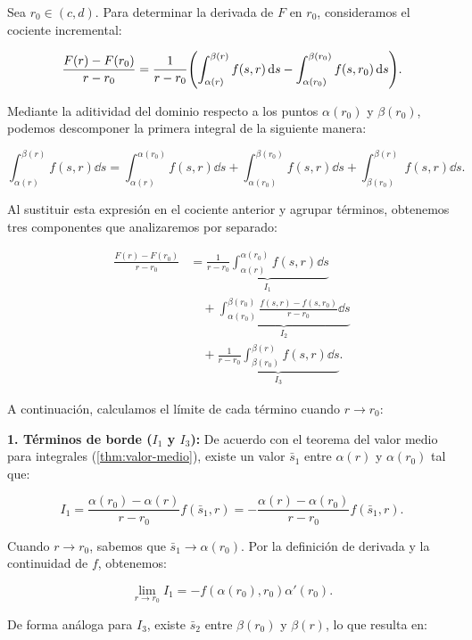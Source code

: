\documentclass[12pt, a4paper, oneside, spanish]{book}
\makeatletter
\renewenvironment{proof}[1][\proofname]{\par
  \pushQED{\qed}
  \normalfont \topsep6\p@\@plus6\p@\relax
  \trivlist
  \item[\hskip\labelsep
        \bfseries\sffamily
        #1\@addpunct{.}]\ignorespaces
}{%
  \popQED\endtrivlist\@endpefalse
}
\makeatother
\begin{document}
\begin{proof}

  Sea \( r_0 \in (c,d) \). Para determinar la derivada de \( F \) en \( r_0 \), consideramos el cociente incremental:

  \[ \frac{F(r) - F(r_0)}{r-r_0} = \frac{1}{r-r_0} \qty(\int_{\alpha(r)}^{\beta(r)} f(s,r) \dd{s} - \int_{\alpha(r_0)}^{\beta(r_0)} f(s,r_0) \dd{s} ). \]

  Mediante la aditividad del dominio respecto a los puntos \( \alpha(r_0) \) y \( \beta(r_0) \), podemos descomponer la primera integral de la siguiente manera:
  
  \[ \int_{\alpha(r)}^{\beta(r)} f(s,r) \dd{s} = \int_{\alpha(r)}^{\alpha(r_0)}f(s,r) \dd{s} + \int_{\alpha(r_0)}^{\beta(r_0)} f(s,r)\dd{s} + \int_{\beta(r_0)}^{\beta(r)} f(s,r)\dd{s}. \]

  Al sustituir esta expresión en el cociente anterior y agrupar términos, obtenemos tres componentes que analizaremos por separado:

  \[
  \begin{aligned}
  \frac{F(r) - F(r_0)}{r - r_0} &= \underbrace{\frac{1}{r - r_0} \int_{\alpha(r)}^{\alpha(r_0)} f(s,r) \dd{s}}_{I_1} \\
  &\quad + \underbrace{\int_{\alpha(r_0)}^{\beta(r_0)} \frac{f(s,r) - f(s,r_0)}{r - r_0} \dd{s}}_{I_2} \\
  &\quad + \underbrace{\frac{1}{r - r_0} \int_{\beta(r_0)}^{\beta(r)} f(s,r) \dd{s}}_{I_3}.
  \end{aligned}
  \]

  A continuación, calculamos el límite de cada término cuando \( r \to r_0 \):

  \textbf{1. Términos de borde (\( I_1 \) y \( I_3 \)):} De acuerdo con el teorema del valor medio para integrales (\cref{thm:valor-medio}), existe un valor \( \bar{s}_1 \) entre \( \alpha(r) \) y \( \alpha(r_0) \) tal que:

  \[ I_1 = \frac{\alpha(r_0) - \alpha(r)}{r-r_0} f(\bar{s}_1,r) = - \frac{\alpha(r) - \alpha(r_0)}{r-r_0}f(\bar{s}_1,r). \]

  Cuando \( r \to r_0 \), sabemos que \( \bar{s}_1 \to \alpha(r_0) \). Por la definición de derivada y la continuidad de \( f \), obtenemos:

  \[ \lim_{r\to r_0} I_{1} = - f(\alpha(r_0), r_0) \alpha'(r_0). \]

  De forma análoga para \( I_3 \), existe \( \bar{s}_2 \) entre \( \beta(r_0) \) y \( \beta(r) \), lo que resulta en:


\end{proof}
\end{document}
